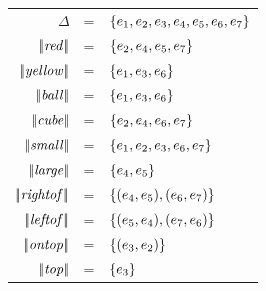 \begin{figure}
\begin{flushleft}
\begin{tabular}{rcl}
$\Delta$              & = & $\{e_1,e_2,e_3,e_4,e_5,e_6,e_7\}$\\
$|\!|\mathit{red}|\!|$      & = & $\{e_2,e_4,e_5,e_7\}$\\
$|\!|\mathit{yellow}|\!|$   & = & $\{e_1,e_3,e_6\}$\\
$|\!|\mathit{ball}|\!|$     & = & $\{e_1,e_3,e_6\}$\\
$|\!|\mathit{cube}|\!|$     & = & $\{e_2,e_4,e_6,e_7\}$\\

$|\!|\mathit{small}|\!|$    & = & $\{e_1,e_2,e_3,e_6,e_7\}$\\
$|\!|\mathit{large}|\!|$    & = & $\{e_4,e_5\}$\\

$|\!|\mathit{rightof}|\!|$   & = & $\{(e_4,e_5),(e_6,e_7)\}$\\
$|\!|\mathit{leftof}|\!|$    & = & $\{(e_5,e_4),(e_7,e_6)\}$\\
$|\!|\mathit{ontop}|\!|$     & = & $\{(e_3,e_2)\}$\\
$|\!|\mathit{top}|\!|$       & = & $\{e_3\}$\\


\end{tabular}
\end{flushleft}
\end{figure}
